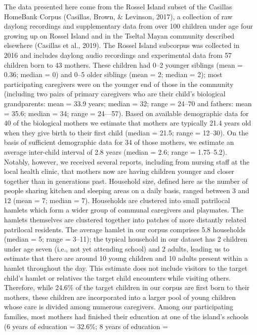 \documentclass[,man,floatsintext]{apa6}
\begin{document}
The data presented here come from the Rossel Island subset of the
Casillas HomeBank Corpus (Casillas, Brown, \& Levinson, 2017), a
collection of raw daylong recordings and supplementary data from over
100 children under age four growing up on Rossel Island and in the
Tseltal Mayan community described elsewhere (Casillas et al., 2019). The
Rossel Island subcorpus was collected in 2016 and includes daylong audio
recordings and experimental data from 57 children born to 43 mothers.
These children had 0--2 younger siblings (mean = 0.36; median = 0) and
0--5 older siblings (mean = 2; median = 2); most participating
caregivers were on the younger end of those in the community (including
two pairs of primary caregivers who are their child's biological
grandparents: mean = 33.9 years; median = 32; range = 24--70 and
fathers: mean = 35.6; median = 34; range = 24---57). Based on available
demographic data for 40 of the biological mothers we estimate that
mothers are typically 21.4 years old when they give birth to their first
child (median = 21.5; range = 12--30). On the basis of sufficient
demographic data for 34 of those mothers, we estimate an average
inter-child interval of 2.8 years (median = 2.6; range = 1.75--5.2).
Notably, however, we received several reports, including from nursing
staff at the local health clinic, that mothers now are having children
younger and closer together than in generations past. Household size,
defined here as the number of people sharing kitchen and sleeping areas
on a daily basis, ranged between 3 and 12 (mean = 7; median = 7).
Households are clustered into small patrilocal hamlets which form a
wider group of communal caregivers and playmates. The hamlets themselves
are clustered together into patches of more distantly related patrilocal
residents. The average hamlet in our corpus comprises 5.8 households
(median = 5; range = 3--11); the typical household in our dataset has 2
children under age seven (i.e., not yet attending school) and 2 adults,
leading us to estimate that there are around 10 young children and 10
adults present within a hamlet throughout the day. This estimate does
not include visitors to the target child's hamlet or relatives the
target child encounters while visiting others. Therefore, while 24.6\%
of the target children in our corpus are first born to their mothers,
these children are incorporated into a larger pool of young children
whose care is divided among numerous caregivers. Among our participating
families, most mothers had finished their education at one of the
island's schools (6 years of education = 32.6\%; 8 years of education =
\end{document}
